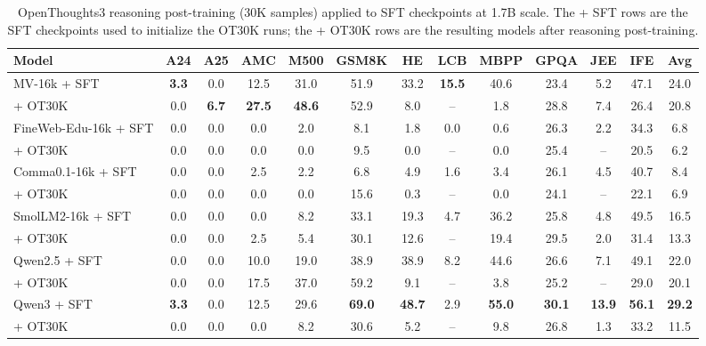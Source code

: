 \begin{table}[ht]
\centering
\caption{OpenThoughts3 reasoning post-training (30K samples) applied to SFT checkpoints at 1.7B scale. The + SFT rows are the SFT checkpoints used to initialize the OT30K runs; the + OT30K rows are the resulting models after reasoning post-training.}
\label{tab:evalchemy_ot30k}
\scriptsize
\begin{tabular}{lcccccccccccc}
\toprule
\textbf{Model} & \textbf{A24} & \textbf{A25} & \textbf{AMC} & \textbf{M500} & \textbf{GSM8K} & \textbf{HE} & \textbf{LCB} & \textbf{MBPP} & \textbf{GPQA} & \textbf{JEE} & \textbf{IFE} & \textbf{Avg} \\
\midrule
MV-16k + SFT & \textbf{3.3} & 0.0 & 12.5 & 31.0 & 51.9 & 33.2 & \textbf{15.5} & 40.6 & 23.4 & 5.2 & 47.1 & 24.0 \\
\quad + OT30K & 0.0 & \textbf{6.7} & \textbf{27.5} & \textbf{48.6} & 52.9 & 8.0 & -- & 1.8 & 28.8 & 7.4 & 26.4 & 20.8 \\
\midrule
\addlinespace[0.3em]
FineWeb-Edu-16k + SFT & 0.0 & 0.0 & 0.0 & 2.0 & 8.1 & 1.8 & 0.0 & 0.6 & 26.3 & 2.2 & 34.3 & 6.8 \\
\quad + OT30K & 0.0 & 0.0 & 0.0 & 0.0 & 9.5 & 0.0 & -- & 0.0 & 25.4 & -- & 20.5 & 6.2 \\
\midrule
\addlinespace[0.3em]
Comma0.1-16k + SFT & 0.0 & 0.0 & 2.5 & 2.2 & 6.8 & 4.9 & 1.6 & 3.4 & 26.1 & 4.5 & 40.7 & 8.4 \\
\quad + OT30K & 0.0 & 0.0 & 0.0 & 0.0 & 15.6 & 0.3 & -- & 0.0 & 24.1 & -- & 22.1 & 6.9 \\
\midrule
\addlinespace[0.3em]
SmolLM2-16k + SFT & 0.0 & 0.0 & 0.0 & 8.2 & 33.1 & 19.3 & 4.7 & 36.2 & 25.8 & 4.8 & 49.5 & 16.5 \\
\quad + OT30K & 0.0 & 0.0 & 2.5 & 5.4 & 30.1 & 12.6 & -- & 19.4 & 29.5 & 2.0 & 31.4 & 13.3 \\
\midrule
\addlinespace[0.3em]
Qwen2.5 + SFT & 0.0 & 0.0 & 10.0 & 19.0 & 38.9 & 38.9 & 8.2 & 44.6 & 26.6 & 7.1 & 49.1 & 22.0 \\
\quad + OT30K & 0.0 & 0.0 & 17.5 & 37.0 & 59.2 & 9.1 & -- & 3.8 & 25.2 & -- & 29.0 & 20.1 \\
\midrule
\addlinespace[0.3em]
Qwen3 + SFT & \textbf{3.3} & 0.0 & 12.5 & 29.6 & \textbf{69.0} & \textbf{48.7} & 2.9 & \textbf{55.0} & \textbf{30.1} & \textbf{13.9} & \textbf{56.1} & \textbf{29.2} \\
\quad + OT30K & 0.0 & 0.0 & 0.0 & 8.2 & 30.6 & 5.2 & -- & 9.8 & 26.8 & 1.3 & 33.2 & 11.5 \\
\bottomrule
\end{tabular}
\end{table}
